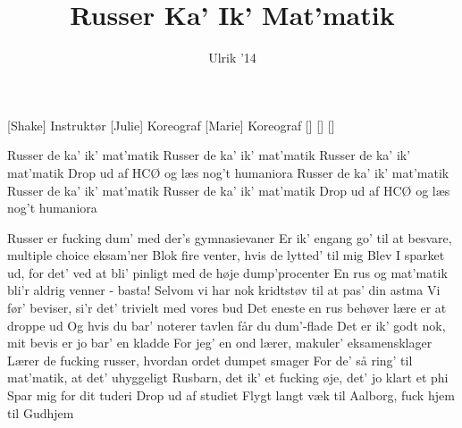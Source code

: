 \documentclass[a4paper,11pt]{article}
\title{Russer Ka' Ik' Mat'matik}
\author{Ulrik '14}
\begin{document}
\maketitle

\begin{roles}
[Shake] Instruktør
[Julie] Koreograf
[Marie] Koreograf
[]
[]
[]
\end{roles}

\begin{song}















 Russer de ka' ik' mat'matik
Russer de ka' ik' mat'matik
Russer de ka' ik' mat'matik
Drop ud af HCØ og læs nog't humaniora
Russer de ka' ik' mat'matik
Russer de ka' ik' mat'matik
Russer de ka' ik' mat'matik
Drop ud af HCØ og læs nog't humaniora

 Russer er fucking dum' med der's gymnasievaner
 Er ik' engang go' til at besvare, multiple choice eksam'ner
 Blok fire venter, hvis de lytted' til mig
Blev I sparket ud, for det' ved at bli' pinligt med de høje dump'procenter
 En rus og mat'matik bli'r aldrig venner - basta!
 Selvom vi har nok kridtstøv til at pas' din astma
 Vi før' beviser, si'r det' trivielt med vores bud
Det eneste en rus behøver lære er at droppe ud
 Og hvis du bar' noterer tavlen får du dum'-flade
 Det er ik' godt nok, mit bevis er jo bar' en kladde
 For jeg' en ond lærer, makuler' eksamensklager
Lærer de fucking russer, hvordan ordet dumpet smager
 For de' så ring' til mat'matik, at det' uhyggeligt
 Rusbarn, det ik' et fucking øje, det' jo klart et phi
 Spar mig for dit tuderi
 Drop ud af studiet
 Flygt langt væk til Aalborg, fuck hjem til Gudhjem


\end{song}
\end{document}
